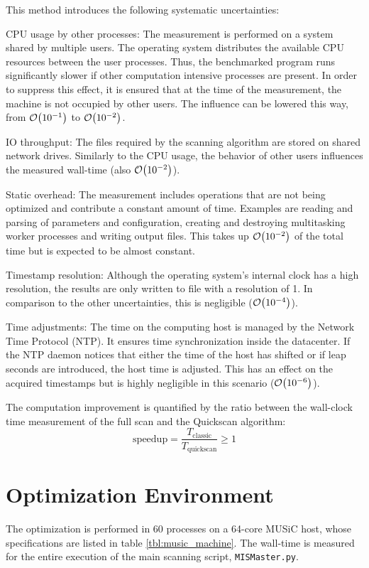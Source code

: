 This method introduces the following systematic uncertainties:
\begin{my_list}
	\item CPU usage by other processes: The measurement is performed on a system shared by multiple users. The operating system distributes the available CPU resources between the user processes. Thus, the benchmarked program runs significantly slower if other computation intensive processes are present. In order to suppress this effect, it is ensured that at the time of the measurement, the machine is not occupied by other users. The influence can be lowered this way, from $\order{10^{-1}}$ to $\order{10^{-2}}$.
	\item IO throughput: The files required by the scanning algorithm are stored on shared network drives. Similarly to the CPU usage, the behavior of other users influences the measured wall-time (also $\order{10^{-2}}$).
	\item Static overhead: The measurement includes operations that are not being optimized and contribute a constant amount of time. Examples are reading and parsing of parameters and configuration, creating and destroying multitasking worker processes and writing output files. This takes up $\order{10^{-2}}$ of the total time but is expected to be almost constant.
	\item Timestamp resolution: Although the operating system's internal clock has a high resolution, the results are only written to file with a resolution of \unit{1}{\second}. In comparison to the other uncertainties, this is negligible ($\order{10^{-4}}$). 
	\item Time adjustments: The time on the computing host is managed by the Network Time Protocol (NTP). It ensures time synchronization inside the datacenter. If the NTP daemon notices that either the time of the host has shifted or if leap seconds are introduced, the host time is adjusted. This has an effect on the acquired timestamps but is highly negligible in this scenario ($\order{10^{-6}}$).
\end{my_list}

The computation improvement is quantified by the ratio between the wall-clock time measurement of the full scan and the Quickscan algorithm:
\begin{equation}
	\textrm{speedup} = \frac{T_{\textrm{classic}}}{T_{\textrm{quickscan}}} \geq 1 
\end{equation}


\section{Optimization Environment}
The optimization is performed in 60 processes on a 64-core MUSiC host, whose specifications are listed in table \ref{tbl:music_machine}. The wall-time is measured for the entire execution of the main scanning script, \texttt{MISMaster.py}.

